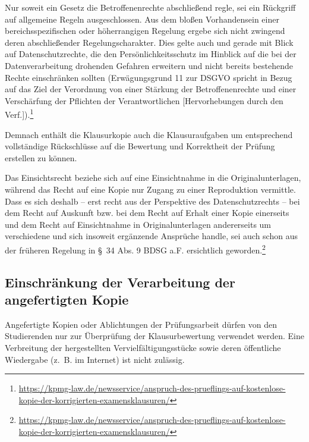 \documentclass[12pt, a4paper]{article}
\begin{document}
Nur soweit ein Gesetz die Betroffenenrechte abschließend regle, sei ein Rückgriff auf allgemeine Regeln ausgeschlossen. Aus dem bloßen Vorhandensein einer bereichsspezifischen oder höherrangigen Regelung ergebe sich nicht zwingend deren abschließender Regelungscharakter. Dies gelte auch und gerade mit Blick auf Datenschutzrechte, die den Persönlichkeitsschutz im Hinblick auf die bei der Datenverarbeitung drohenden Gefahren erweitern und nicht bereits bestehende Rechte einschränken sollten (Erwägungsgrund 11 zur DSGVO spricht in Bezug auf das Ziel der Verordnung von einer Stärkung der Betroffenenrechte und einer Verschärfung der Pflichten der Verantwortlichen [Hervorhebungen durch den Verf.]).\footnote{\href{https://kpmg-law.de/newsservice/anspruch-des-prueflings-auf-kostenlose-kopie-der-korrigierten-examensklausuren/}{https://kpmg-law.de/newsservice/anspruch-des-prueflings-auf-kostenlose-kopie-der-korrigierten-examensklausuren/}}

Demnach enthält die Klausurkopie auch die Klausuraufgaben um entsprechend vollständige Rückschlüsse auf die Bewertung und Korrektheit der Prüfung erstellen zu können.

Das Einsichtsrecht beziehe sich auf eine Einsichtnahme in die Originalunterlagen, während das Recht auf eine Kopie nur Zugang zu einer Reproduktion vermittle. Dass es sich deshalb  – erst recht aus der Perspektive des Datenschutzrechts  – bei dem Recht auf Auskunft bzw. bei dem Recht auf Erhalt einer Kopie einerseits und dem Recht auf Einsichtnahme in Originalunterlagen andererseits um verschiedene und sich insoweit ergänzende Ansprüche handle, sei auch schon aus der früheren Regelung in § 34 Abs. 9 BDSG a.F. ersichtlich geworden.\footnote{\href{https://kpmg-law.de/newsservice/anspruch-des-prueflings-auf-kostenlose-kopie-der-korrigierten-examensklausuren/}{https://kpmg-law.de/newsservice/anspruch-des-prueflings-auf-kostenlose-kopie-der-korrigierten-examensklausuren/}} 


\subsection{Einschränkung der Verarbeitung der angefertigten Kopie} 
Angefertigte Kopien oder Ablichtungen der Prüfungsarbeit dürfen von den Studierenden nur zur Überprüfung der Klausurbewertung verwendet werden. Eine Verbreitung der hergestellten Vervielfältigungsstücke sowie deren öffentliche Wiedergabe (z. B. im Internet) ist nicht zulässig.
\end{document}
